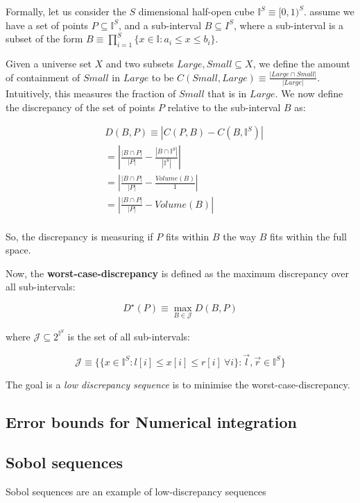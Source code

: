 \documentclass[titlepage]{article}
\newcommand{\I}{\mathbb{I}}
\begin{document}
Formally, let us consider the $S$ dimensional half-open cube $\I^S \equiv [0, 1)^S$.
assume we have a set of points $P \subseteq \I^S$, and a sub-interval
$B \subseteq I^S$, where a sub-interval is a subset of the form 
$B \equiv \prod_{i=1}^S \{ x \in \I : a_i \leq x \leq b_i \}$.

Given a universe set $X$ and two subsets $Large, Small \subseteq X$, we define
the amount of containment of $Small$ in $Large$ to be $C(Small, Large) \equiv
\frac{|Large \cap Small|}{|Large|}$. Intuitively, this measures the fraction
of $Small$ that is in $Large$. We now define the discrepancy of the set
of points $P$ relative to the sub-interval $B$ as:

\begin{align*}
&D(B, P) \equiv \left| C(P, B) - C(B, \I^S) \right| \\
&= \left| \frac{|B \cap P|}{|P|} - \frac{|B \cap \I^S|}{|\I^S|} \right|  \\
&= \left| \frac{|B \cap P|}{|P|} - \frac{Volume(B)}{1} \right| \\
&= \left| \frac{|B \cap P|}{|P|} - Volume(B) \right| \\
\end{align*}

So, the discrepancy is measuring if $P$ fits within $B$ the way $B$ fits within
the full space.

Now, the \textbf{worst-case-discrepancy} is defined as the maximum discrepancy
over all sub-intervals:

$$
D^\star(P) \equiv \max_{B \in \mathcal{J}} D(B, P)
$$

where $\mathcal{J} \subseteq 2^{\I^S}$ is the set of all sub-intervals:

$$
\mathcal{J} \equiv \{ \{ x \in \I^S : l[i] \leq x[i] \leq r[i]~\forall i \} : \vec l, \vec r \in \I^S \}
$$

The goal is a \emph{low discrepancy sequence} is to minimise the worst-case-discrepancy.

\subsection{Error bounds for Numerical integration}

\subsection{Sobol sequences}

Sobol sequences are an example of low-discrepancy sequences
\end{document}
